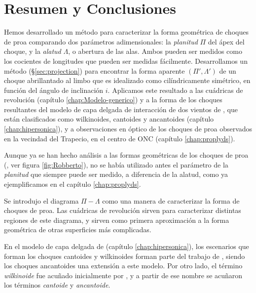 \chapter{Resumen y Conclusiones}
\label{chap:conclusions}
\thispagestyle{empty}

Hemos desarrollado un método para caracterizar la forma geométrica de choques de proa comparando dos parámetros adimensionales: la \textit{planitud} $\Pi$ del ápex del choque, y la \textit{alatud} $\Lambda$, o abertura de las alas. Ambos pueden ser medidos como los cocientes de longitudes que pueden ser medidas fácilmente. Desarrollamos un método (\S \ref{sec:projection}) para encontrar la forma aparente $(\Pi', \Lambda')$ de un choque abrillantado al limbo que es idealizado como cilíndricamente simétrico, en función del ángulo de inclinación $i$. Aplicamos este resultado a las cuádricas de revolución (capítulo \ref{chap:Modelo-generico}) y a la forma de los choques resultantes del modelo de capa delgada de interacción de dos vientos de \CRW{}, que están clasificados como wilkinoides, cantoides y ancantoides (capítulo \ref{chap:hipersonica}), y a observaciones en óptico de los choques de proa observados en la vecindad del Trapecio, en el centro de ONC (capítulo \ref{chap:proplyds}).

Aunque ya se han hecho análisis a las formas geométricas de los choques de proa (\citet{Robberto:2005}, ver figura \ref{fig:Robberto}), no se había utilizado antes el parámetro de la \textit{planitud} que siempre puede ser medido, a diferencia de la alatud, como ya ejemplificamos en el capítulo \ref{chap:proplyds}.


Se introdujo el diagrama $\Pi-\Lambda$ como una manera de caracterizar la forma de choques de proa. Las cuádricas de revolución sirven para caracterizar distintas regiones de este diagrama, y sirven como primera aproximación a la forma geométrica de otras superficies más complicadas.

En el modelo de capa delgada de \CRW{} (capítulo \ref{chap:hipersonica}), los escenarios que forman los choques cantoides y wilkinoides forman parte del trabajo de \CRW{}, siendo los choques ancantoides una extensión a este modelo. Por otro lado, el término \textit{wilkinoide} fue acuñado inicialmente por \citet{Cox:2012}, y a partir de ese nombre se acuñaron los términos \textit{cantoide} y \textit{ancantoide}.

